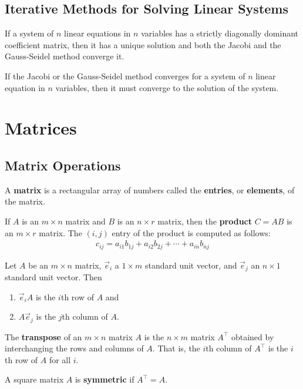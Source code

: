 \documentclass{article}
\begin{document}
\subsection{Iterative Methods for Solving Linear Systems}
\begin{theorem}
	If a system of $n$ linear equations in $n$ variables has a strictly diagonally dominant coefficient matrix, then it has a unique solution and both the Jacobi and the Gauss-Seidel method converge it.
\end{theorem}
\begin{theorem}
	If the Jacobi or the Gauss-Seidel method converges for a system of $n$ linear equation in $n$ variables, then it must converge to the solution of the system.
\end{theorem}
\section{Matrices}
\subsection{Matrix Operations}
\begin{definition}
	A \textbf{matrix} is a rectangular array of numbers called the \textbf{entries}, or \textbf{elements}, of the matrix.
\end{definition}
\begin{definition}
	If $A$ is an $m\times n$ matrix and $B$ is an $n\times r$ matrix, then the \textbf{product} $C=AB$ is an $m\times r$ matrix. The $(i, j)$ entry of the product is computed as follows:
	\begin{gather*}
		c_{ij} = a_{i1}b_{1j}+a_{i2}b_{2j}+\cdots+a_{in}b_{nj}
	\end{gather*}
\end{definition}
\begin{theorem}
	Let $A$ be an $m\times n$ matrix, $\vec e_i$ a $1\times m$ standard unit vector, and $\vec e_j$ an $n\times 1$ standard unit vector. Then
	\begin{enumerate}
		\item $\vec e_iA$ is the $i$th row of $A$ and
		\item $A\vec e_j$ is the $j$th column of $A$.
	\end{enumerate}
\end{theorem}
\begin{definition}
	The \textbf{transpose} of an $m\times n$ matrix $A$ is the $n\times m$ matrix $A^\intercal$ obtained by interchanging the rows and columns of $A$. That is, the $i$th column of $A^\intercal$ is the $i$th row of $A$ for all $i$.
\end{definition}
\begin{definition}
	A square matrix $A$ is \textbf{symmetric} if $A^\intercal = A$.
\end{definition}
\end{document}
